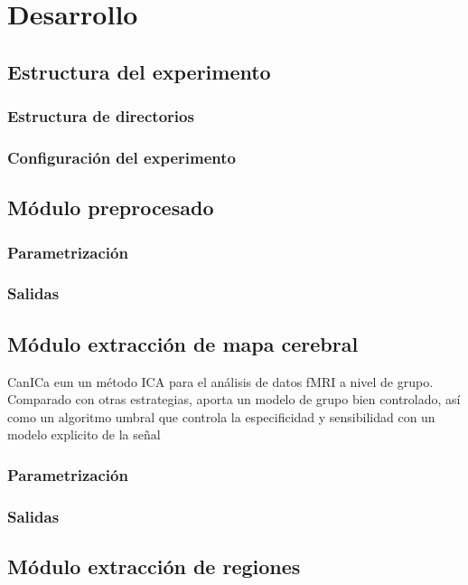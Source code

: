 \chapter{Desarrollo}
\section{Estructura del experimento}
\subsection{Estructura de directorios}
\subsection{Configuración del experimento}
\section{Módulo preprocesado}
\subsection{Parametrización}
\subsection{Salidas}
\section{Módulo extracción de mapa cerebral}

CanICa eun un método ICA para el análisis de datos fMRI a nivel de grupo. Comparado con otras estrategias, aporta un modelo de grupo bien controlado, así como un algoritmo umbral que controla la especificidad y sensibilidad con un modelo explicito de la señal \cite{canica}


\subsection{Parametrización}
\subsection{Salidas}
\section{Módulo extracción de regiones}
